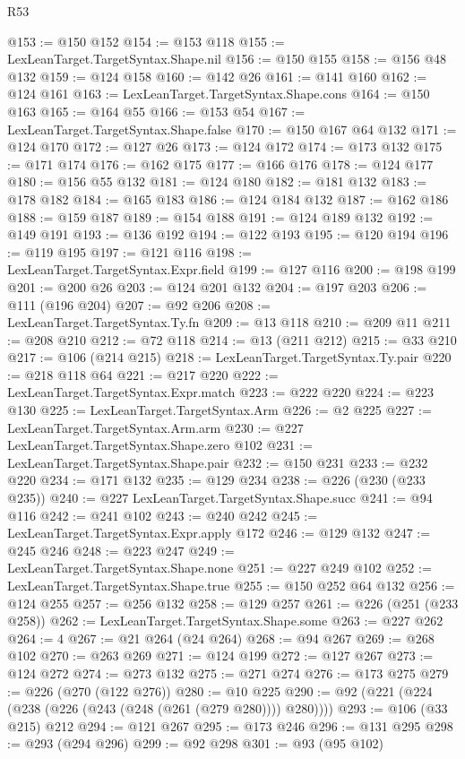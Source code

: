 \begin{lexlean}{R53}
\begin{coremodule}
@153 := @150 @152
@154 := @153 @118
@155 := LexLeanTarget.TargetSyntax.Shape.nil
@156 := @150 @155
@158 := @156 @48 @132
@159 := @124 @158
@160 := @142 @26
@161 := @141 @160
@162 := @124 @161
@163 := LexLeanTarget.TargetSyntax.Shape.cons
@164 := @150 @163
@165 := @164 @55
@166 := @153 @54
@167 := LexLeanTarget.TargetSyntax.Shape.false
@170 := @150 @167 @64 @132
@171 := @124 @170
@172 := @127 @26
@173 := @124 @172
@174 := @173 @132
@175 := @171 @174
@176 := @162 @175
@177 := @166 @176
@178 := @124 @177
@180 := @156 @55 @132
@181 := @124 @180
@182 := @181 @132
@183 := @178 @182
@184 := @165 @183
@186 := @124 @184 @132
@187 := @162 @186
@188 := @159 @187
@189 := @154 @188
@191 := @124 @189 @132
@192 := @149 @191
@193 := @136 @192
@194 := @122 @193
@195 := @120 @194
@196 := @119 @195
@197 := @121 @116
@198 := LexLeanTarget.TargetSyntax.Expr.field
@199 := @127 @116
@200 := @198 @199
@201 := @200 @26
@203 := @124 @201 @132
@204 := @197 @203
@206 := @111 (@196 @204)
@207 := @92 @206
@208 := LexLeanTarget.TargetSyntax.Ty.fn
@209 := @13 @118
@210 := @209 @11
@211 := @208 @210
@212 := @72 @118
@214 := @13 (@211 @212)
@215 := @33 @210
@217 := @106 (@214 @215)
@218 := LexLeanTarget.TargetSyntax.Ty.pair
@220 := @218 @118 @64
@221 := @217 @220
@222 := LexLeanTarget.TargetSyntax.Expr.match
@223 := @222 @220
@224 := @223 @130
@225 := LexLeanTarget.TargetSyntax.Arm
@226 := @2 @225
@227 := LexLeanTarget.TargetSyntax.Arm.arm
@230 := @227 LexLeanTarget.TargetSyntax.Shape.zero @102
@231 := LexLeanTarget.TargetSyntax.Shape.pair
@232 := @150 @231
@233 := @232 @220
@234 := @171 @132
@235 := @129 @234
@238 := @226 (@230 (@233 @235))
@240 := @227 LexLeanTarget.TargetSyntax.Shape.succ
@241 := @94 @116
@242 := @241 @102
@243 := @240 @242
@245 := LexLeanTarget.TargetSyntax.Expr.apply @172
@246 := @129 @132
@247 := @245 @246
@248 := @223 @247
@249 := LexLeanTarget.TargetSyntax.Shape.none
@251 := @227 @249 @102
@252 := LexLeanTarget.TargetSyntax.Shape.true
@255 := @150 @252 @64 @132
@256 := @124 @255
@257 := @256 @132
@258 := @129 @257
@261 := @226 (@251 (@233 @258))
@262 := LexLeanTarget.TargetSyntax.Shape.some
@263 := @227 @262
@264 := 4
@267 := @21 @264 (@24 @264)
@268 := @94 @267
@269 := @268 @102
@270 := @263 @269
@271 := @124 @199
@272 := @127 @267
@273 := @124 @272
@274 := @273 @132
@275 := @271 @274
@276 := @173 @275
@279 := @226 (@270 (@122 @276))
@280 := @10 @225
@290 := @92 (@221 (@224 (@238 (@226 (@243 (@248 (@261 (@279 @280)))) @280))))
@293 := @106 (@33 @215) @212
@294 := @121 @267
@295 := @173 @246
@296 := @131 @295
@298 := @293 (@294 @296)
@299 := @92 @298
@301 := @93 (@95 @102)

\end{coremodule}
\end{lexlean}

